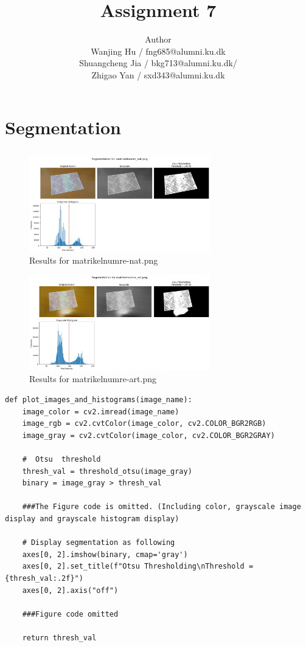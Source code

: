 \documentclass[12pt]{article}
\title{Assignment 7}
\author{Author \\
 Wanjing Hu / fng685@alumni.ku.dk  \\
 Shuangcheng Jia / bkg713@alumni.ku.dk/   \\
 Zhigao Yan / sxd343@alumni.ku.dk  \\
}
\begin{document}
\maketitle

\section{Segmentation}
\subsection{}
\begin{figure}[ht]
    \centering
    \includegraphics[width=0.7\textwidth]{pics/a7-1.1-1.png}
    \caption{Results for matrikelnumre-nat.png}
    \label{1.1-1}
\end{figure}

\begin{figure}[ht]
    \centering
    \includegraphics[width=0.7\textwidth]{pics/a7-1.1-2.png}
    \caption{Results for matrikelnumre-art.png}
    \label{1.1-2}
\end{figure}

\begin{lstlisting}
def plot_images_and_histograms(image_name):
    image_color = cv2.imread(image_name)
    image_rgb = cv2.cvtColor(image_color, cv2.COLOR_BGR2RGB)
    image_gray = cv2.cvtColor(image_color, cv2.COLOR_BGR2GRAY)

    #  Otsu  threshold
    thresh_val = threshold_otsu(image_gray)
    binary = image_gray > thresh_val

    ###The Figure code is omitted. (Including color, grayscale image display and grayscale histogram display)

    # Display segmentation as following
    axes[0, 2].imshow(binary, cmap='gray')
    axes[0, 2].set_title(f"Otsu Thresholding\nThreshold = {thresh_val:.2f}")
    axes[0, 2].axis("off")

    ###Figure code omitted

    return thresh_val
\end{lstlisting}
\end{document}
